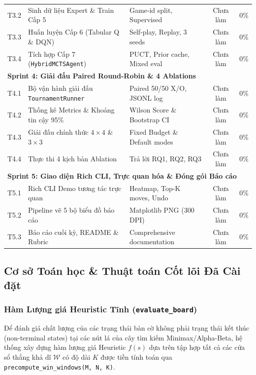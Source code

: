 \documentclass[a4paper,12pt]{report}
\begin{document}
\begin{table}[H]
\begin{tabular}{cp{6.0cm}p{4.6cm}cc}
T3.2 & Sinh dữ liệu Expert \& Train Cấp 5 & Game-id split, Supervised & Chưa làm & 0\% \\
T3.3 & Huấn luyện Cấp 6 (Tabular Q \& DQN) & Self-play, Replay, 3 seeds & Chưa làm & 0\% \\
T3.4 & Tích hợp Cấp 7 (\texttt{HybridMCTSAgent}) & PUCT, Prior cache, Mixed eval & Chưa làm & 0\% \\
\midrule
\multicolumn{5}{l}{\textbf{Sprint 4: Giải đấu Paired Round-Robin \& 4 Ablations}} \\
T4.1 & Bộ vận hành giải đấu \texttt{TournamentRunner} & Paired 50/50 X/O, JSONL log & Chưa làm & 0\% \\
T4.2 & Thống kê Metrics \& Khoảng tin cậy 95\% & Wilson Score \& Bootstrap CI & Chưa làm & 0\% \\
T4.3 & Giải đấu chính thức $4 \times 4$ \& $3 \times 3$ & Fixed Budget \& Default modes & Chưa làm & 0\% \\
T4.4 & Thực thi 4 kịch bản Ablation & Trả lời RQ1, RQ2, RQ3 & Chưa làm & 0\% \\
\midrule
\multicolumn{5}{l}{\textbf{Sprint 5: Giao diện Rich CLI, Trực quan hóa \& Đóng gói Báo cáo}} \\
T5.1 & Rich CLI Demo tương tác trực quan & Heatmap, Top-K moves, Undo & Chưa làm & 0\% \\
T5.2 & Pipeline vẽ 5 bộ biểu đồ báo cáo & Matplotlib PNG (300 DPI) & Chưa làm & 0\% \\
T5.3 & Báo cáo cuối kỳ, README \& Rubric & Comprehensive documentation & Chưa làm & 0\% \\
\bottomrule
\end{tabular}
\end{table}

\subsection{Cơ sở Toán học \& Thuật toán Cốt lõi Đã Cài đặt}

\subsubsection{Hàm Lượng giá Heuristic Tĩnh (\texttt{evaluate\_board})}
Để đánh giá chất lượng của các trạng thái bàn cờ không phải trạng thái kết thúc (non-terminal states) tại các nút lá của cây tìm kiếm Minimax/Alpha-Beta, hệ thống xây dựng hàm lượng giá Heuristic $f(s)$ dựa trên tập hợp tất cả các cửa sổ thắng khả dĩ $\mathcal{W}$ có độ dài $K$ được tiền tính toán qua \texttt{precompute\_win\_windows(M, N, K)}.
\end{document}
